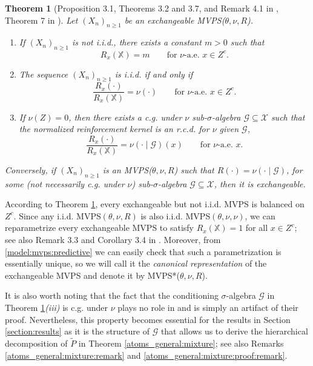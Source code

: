 \documentclass[a4paper]{article}
\theoremstyle{plain}
\newtheorem{theorem}{Theorem}
\theoremstyle{remark}
\theoremstyle{definition}
\begin{document}
\begin{theorem}[Proposition 3.1, Theorems 3.2 and 3.7, and Remark 4.1 in \cite{sariev2024}, Theorem 7 in \cite{berti2023kernel}]\label{introTh_1}
Let $(X_n)_{n\geq 1}$ be an exchangeable MVPS($\theta,\nu,R$).
\begin{enumerate}
\item If $(X_n)_{n\geq 1}$ is not i.i.d., there exists a constant $m>0$ such that
\begin{equation}\label{R=m}
R_x(\mathbb{X})=m\qquad\mbox{for }\nu\mbox{-a.e. }x\in Z^c.
\end{equation}
\item The sequence $(X_n)_{n\geq 1}$ is i.i.d. if and only if
\[\frac{R_x(\cdot)}{R_x(\mathbb{X})}=\nu(\cdot)\qquad\mbox{for }\nu\mbox{-a.e. }x\in Z^c.\]
\item  If $\nu(Z)=0$, then there exists a c.g. under $\nu$ sub-$\sigma$-algebra $\mathcal{G}\subseteq\mathcal{X}$ such that the normalized reinforcement kernel is an r.c.d. for $\nu$ given $\mathcal{G}$,
\begin{equation}\label{introduction_thrm}
\frac{R_x(\cdot)}{R_x(\mathbb{X})}=\nu(\cdot\mid\mathcal{G})(x)\qquad\mbox{for }\nu\mbox{-a.e. }x.
\end{equation}
\end{enumerate}
Conversely, if $(X_n)_{n\geq 1}$ is an MVPS($\theta,\nu,R$) such that $R(\cdot)=\nu(\cdot\mid\mathcal{G})$, for some (not necessarily c.g. under $\nu$) sub-$\sigma$-algebra $\mathcal{G}\subseteq\mathcal{X}$, then it is exchangeable.
\end{theorem}

According to Theorem \ref{introTh_1}, every exchangeable but not i.i.d. MVPS is balanced on $Z^c$. Since any i.i.d. MVPS$(\theta,\nu,R)$ is also i.i.d. MVPS$(\theta,\nu,\nu)$, we can reparametrize every exchangeable MVPS to satisfy $R_x(\mathbb{X})=1$ for all $x\in Z^c$; see also Remark 3.3 and Corollary 3.4 in \cite{sariev2024}. Moreover, from \eqref{model:mvps:predictive} we can easily check that such a parametrization is essentially unique, so we will call it the \textit{canonical representation} of the exchangeable MVPS and denote it by MVPS*($\theta,\nu,R$).

It is also worth noting that the fact that the conditioning $\sigma$-algebra $\mathcal{G}$ in Theorem \ref{introTh_1}\textit{(iii)} is c.g. under $\nu$ plays no role in \cite{sariev2024} and is simply an artifact of their proof. Nevertheless, this property becomes essential for the results in Section \ref{section:results} as it is the structure of $\mathcal{G}$ that allows us to derive the hierarchical decomposition of $\tilde{P}$ in Theorem \ref{atoms_general:mixture}; see also Remarks \ref{atoms_general:mixture:remark} and \ref{atoms_general:mixture:proof:remark}. 
\end{document}
